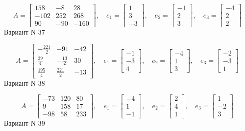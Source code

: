 \documentclass[11pt]{report}
\begin{document}
$$A = \left[\begin{matrix}158 & -8 & 28\\-102 & 252 & 268\\90 & -90 & -160\end{matrix}\right],\quad e_1 = \left[\begin{matrix}1\\3\\-3\end{matrix}\right],\quad e_2 = \left[\begin{matrix}-1\\2\\3\end{matrix}\right],\quad e_3 = \left[\begin{matrix}-4\\2\\2\end{matrix}\right]$$Вариант N 37

$$A = \left[\begin{matrix}- \frac{221}{2} & -91 & -42\\\frac{39}{4} & - \frac{13}{2} & 30\\\frac{195}{4} & \frac{221}{2} & -13\end{matrix}\right],\quad e_1 = \left[\begin{matrix}-1\\-3\\4\end{matrix}\right],\quad e_2 = \left[\begin{matrix}-4\\1\\3\end{matrix}\right],\quad e_3 = \left[\begin{matrix}-2\\-3\\1\end{matrix}\right]$$Вариант N 38

$$A = \left[\begin{matrix}-73 & 120 & 80\\9 & 158 & 17\\-98 & 58 & 233\end{matrix}\right],\quad e_1 = \left[\begin{matrix}-4\\1\\-1\end{matrix}\right],\quad e_2 = \left[\begin{matrix}2\\4\\1\end{matrix}\right],\quad e_3 = \left[\begin{matrix}1\\-2\\3\end{matrix}\right]$$Вариант N 39
\end{document}
